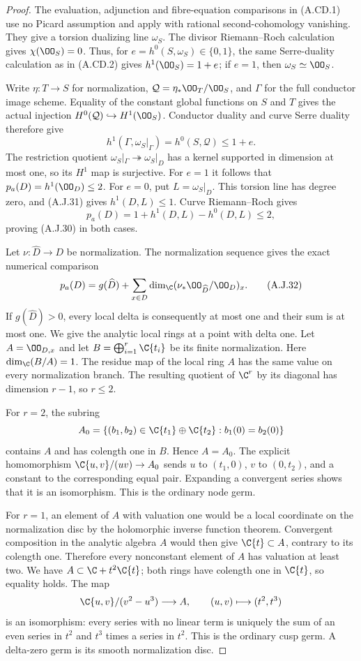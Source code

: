 \begin{proof}
The evaluation, adjunction and fibre-equation comparisons
in (A.CD.1) use no Picard assumption and apply with
rational second-cohomology vanishing. They give a torsion
dualizing line $\omega_S$. The divisor Riemann--Roch
calculation gives $\chi(\OO_S)=0$. Thus, for
$e=h^0(S,\omega_S)\in\{0,1\}$, the same Serre-duality
calculation as in (A.CD.2) gives
$h^1(\OO_S)=1+e$; if $e=1$, then
$\omega_S\simeq\OO_S$.

Write $\eta:T\to S$ for normalization,
$\mathcal Q=\eta_*\OO_T/\OO_S$, and $\Gamma$ for
the full conductor image scheme. Equality of the
constant global functions on $S$ and $T$ gives the
actual injection $H^0(\mathcal Q)\hookrightarrow
H^1(\OO_S)$. Conductor duality and curve Serre duality
therefore give
\[
 h^1(\Gamma,\omega_S|_\Gamma)
       =h^0(S,\mathcal Q)\le1+e.                  \tag{A.J.31}
\]
The restriction quotient
$\omega_S|_\Gamma\twoheadrightarrow\omega_S|_D$
has a kernel supported in dimension at most one, so
its $H^1$ map is surjective. For $e=1$ it follows that
$p_a(D)=h^1(\OO_D)\le2$. For $e=0$, put
$L=\omega_S|_D$. This torsion line has degree zero,
and (A.J.31) gives $h^1(D,L)\le1$. Curve
Riemann--Roch gives
\[
 p_a(D)=1+h^1(D,L)-h^0(D,L)\le2,
\]
proving (A.J.30) in both cases.

Let $\nu:\widehat D\to D$ be normalization. The
normalization sequence gives the exact numerical
comparison
\[
 p_a(D)=g(\widehat D)+
        \sum_{x\in D}\dim_{\C}
          (\nu_*\OO_{\widehat D}/\OO_D)_x.       \tag{A.J.32}
\]
If $g(\widehat D)>0$, every local delta is consequently
at most one and their sum is at most one. We give the
analytic local rings at a point with delta one.
Let $A=\OO_{D,x}$ and let
$B=\bigoplus_{i=1}^r\C\{t_i\}$ be its finite
normalization. Here $\dim_{\C}(B/A)=1$. The residue map
of the local ring $A$ has the same value on every
normalization branch. The resulting quotient of
$\C^r$ by its diagonal has dimension $r-1$, so
$r\le2$.

For $r=2$, the subring
\[
 A_0=\{(b_1,b_2)\in\C\{t_1\}\oplus\C\{t_2\}:
                                  b_1(0)=b_2(0)\}
\]
contains $A$ and has colength one in $B$. Hence
$A=A_0$. The explicit homomorphism
$\C\{u,v\}/(uv)\to A_0$ sends
$u$ to $(t_1,0)$, $v$ to $(0,t_2)$, and a constant
to the corresponding equal pair. Expanding a
convergent series shows that it is an isomorphism.
This is the ordinary node germ.

For $r=1$, an element of $A$ with valuation one would
be a local coordinate on the normalization disc by
the holomorphic inverse function theorem. Convergent
composition in the analytic algebra $A$ would then
give $\C\{t\}\subset A$, contrary to its colength
one. Therefore every nonconstant element of $A$ has
valuation at least two. We have
$A\subset\C+t^2\C\{t\}$; both rings have
colength one in $\C\{t\}$, so equality holds.
The map
\[
 \C\{u,v\}/(v^2-u^3)\longrightarrow A,
                 \qquad (u,v)\longmapsto(t^2,t^3)
\]
is an isomorphism: every series with no linear term
is uniquely the sum of an even series in $t^2$ and
$t^3$ times a series in $t^2$. This is the ordinary
cusp germ. A delta-zero germ is its smooth
normalization disc.


\end{proof}
